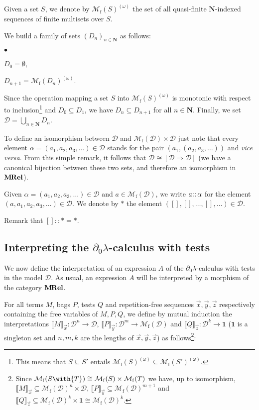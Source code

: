 \documentclass{LMCS}
\newcommand{\nat}{\mathbf{N}}
\newcommand{\one}{\mathbf{1}}
\newcommand{\Omegatuple}[1]{\Mfin{#1}^{(\omega)}}
\newcommand{\MRel}{\bold{M\hspace{-1pt}Rel}}
\newcommand{\With}[2]{{#1}\with{#2}}
\newcommand{\Funint}[2]{[{#1}\!\imp\!{#2}]}
\newcommand{\dzlam}{\ensuremath{\partial_0\lambda}}
\newcommand{\Int}[1]{\llbracket #1\rrbracket} \newcommand{\trm}[1]{#1^{\textrm{--}}}
\newcommand{\Mfin}[1]{\mathcal{M}_{\mathrm{f}}(#1)}
\newcommand{\seq}[1]{\vec{#1}}
\newcommand{\imp}{\Rightarrow}
\newcommand{\ga}{\alpha}
\newcommand{\cD}{\mathcal{D}}
\begin{document}
Given a set $S$, we denote by $\Omegatuple S$ the set of all quasi-finite 
$\nat$-indexed sequences of finite multisets over $S$.

\begin{defi} We build a family of sets $(D_n)_{n\in\nat}$ as follows:  
\begin{iteMize}{$\bullet$}
\item 
	$D_0=\emptyset$, 
\item 
	$D_{n+1}=\Omegatuple{D_n}$.
\end{iteMize}
Since the operation mapping a set $S$ into $\Omegatuple S$ is monotonic with respect to inclusion\footnote{
This means that $S\subseteq S'$ entails $\Omegatuple S \subseteq \Omegatuple{S'}$.
} and $D_0\subseteq D_1$, we have $D_n\subseteq D_{n+1}$ for all $n\in\nat$. 
Finally, we set $\cD=\bigcup_{n\in\nat}D_n$.
\end{defi}

To define an isomorphism between $\cD$ and $\Mfin{\cD}\times{\cD}$
just note that every element $\ga = (a_1, a_2, a_3,\ldots)\in \cD$ stands for the pair
$(a_1, (a_2, a_3,\ldots))$ and \emph{vice versa}. 
From this simple remark, it follows that $\cD\cong\Funint{\cD}{\cD}$ (we have a canonical bijection between these
two sets, and therefore an isomorphism in $\MRel$).

\begin{nota}
Given $\ga = (a_1, a_2, a_3,\ldots)\in\cD$ and $a\in\Mfin{\cD}$, we write $a\at \ga$ for the element $(a,a_1,a_2, a_3,\ldots)\in\cD$.
We denote by $*$ the element  $([],[],\ldots,[],\ldots)\in\cD$. 
\end{nota}

Remark that $[] :: * = *$.

\subsection{Interpreting the \dzlam-calculus with tests}\label{subsec:dzlam-interpretation}
We now define the interpretation of an expression $A$ of the  \dzlam-calculus with tests
in the model $\cD$. As usual, an expression $A$ will be interpreted by a morphism of the category $\MRel$.


For all terms $M$, bags $P$, tests $Q$ and repetition-free se\-quen\-ces $\seq x, \seq y, \seq z$
respectively containing the free variables of $M,P,Q$, we define by mutual induction the interpretations
 $\Int{M}_{\seq x}:\cD^n \to \cD$,
 $\Int{P}_{\seq y}:\cD^m \to \Mfin{\cD}$ and
 $\Int{Q}_{\seq z}:\cD^k \to \one$ ($\one$ is a singleton set and $n,m,k$ are the lengths of $\seq x,\seq y,\seq z$) as follows\footnote{Since $\Mfin{\With ST}\cong\Mfin{S}\times\Mfin{T}$ we have, up to isomorphism, $\Int{M}_{\seq x}\subseteq\Mfin{\cD}^n\times \cD$,
$\Int{P}_{\seq y}\subseteq\Mfin{\cD}^{m+1}$ and $\Int{Q}_{\seq z}\subseteq\Mfin{\cD}^k\times\one \cong \Mfin{\cD}^k$.}:
\end{document}
